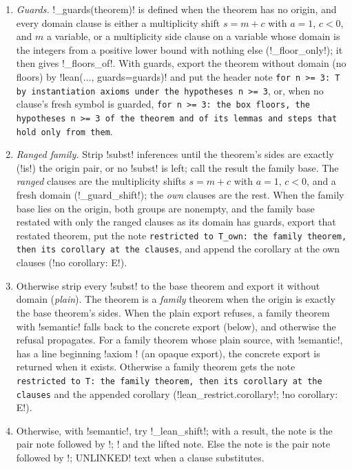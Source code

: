 \begin{algorithm}\label{alg:kernel-lean-restricted}
\begin{enumerate}
\item \emph{Guards.} \py!_guards(theorem)! is defined when the theorem has no origin, and every domain clause is either a multiplicity shift $s=m+c$ with $a=1$, $c<0$, and $m$ a variable, or a multiplicity side clause on a variable whose domain is the integers from a positive lower bound with nothing else (\py!_floor_only!); it then gives \py!_floors_of!. With guards, export the theorem without domain (no floors) by \py!lean(..., guards=guards)! and put the header note \texttt{for n >= 3: T by instantiation axioms under the hypotheses n >= 3}, or, when no clause's fresh symbol is guarded, \texttt{for n >= 3: the box floors,\allowbreak{} the hypotheses n >= 3 of the theorem and of its lemmas and steps that hold only from them}.
\item \emph{Ranged family.} Strip \code!subst! inferences until the theorem's sides are exactly (\py!is!) the origin pair, or no \code!subst! is left; call the result the family base. The \emph{ranged} clauses are the multiplicity shifts $s=m+c$ with $a=1$, $c<0$, and a fresh domain (\py!_guard_shift!); the \emph{own} clauses are the rest. When the family base lies on the origin, both groups are nonempty, and the family base restated with only the ranged clauses as its domain has guards, export that restated theorem, put the note \texttt{restricted to T\_\allowbreak{}own: the family theorem,\allowbreak{} then its corollary at the clauses}, and append the corollary at the own clauses (\code!no corollary: E!).
\item Otherwise strip every \code!subst! to the base theorem and export it without domain (\emph{plain}). The theorem is a \emph{family} theorem when the origin is exactly the base theorem's sides. When the plain export refuses, a family theorem with \code!semantic! falls back to the concrete export (below), and otherwise the refusal propagates. For a family theorem whose plain source, with \code!semantic!, has a line beginning \code!axiom ! (an opaque export), the concrete export is returned when it exists. Otherwise a family theorem gets the note \texttt{restricted to T: the family theorem,\allowbreak{} then its corollary at the clauses} and the appended corollary (\py!lean_restrict.corollary!; \code!no corollary: E!).
\item Otherwise, with \code!semantic!, try \py!_lean_shift!; with a result, the note is the pair note followed by \code!; ! and the lifted note. Else the note is the pair note followed by \code!; UNLINKED! text when a clause substitutes.
\end{enumerate}
\end{algorithm}

